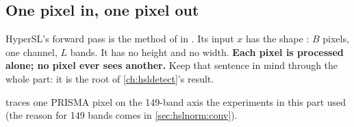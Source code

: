 \subsection{One pixel in, one pixel out}

HyperSL's forward pass is the method  of  in .
Its input $x$ has the shape : $B$ pixels, one channel, $L$ bands. It has no height and no
width.
\textbf{Each pixel is processed alone; no pixel ever sees another.} Keep that sentence in mind through the whole part:
it is the root of \cref{ch:hsldetect}'s result.

 traces one PRISMA pixel on the 149-band axis the experiments in this part used (the reason
for 149 bands comes in \cref{sec:hslnorm:conv}).

